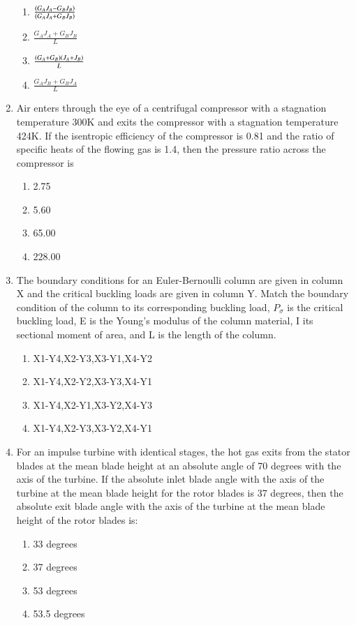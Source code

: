 \documentclass[journal]{IEEEtran}
\numberwithin{equation}{enumi}
\numberwithin{figure}{enumi}
\begin{document}
\begin{enumerate}[start=35]
    \begin{enumerate}
        \item $\frac{\left(G_A J_A - G_B J_B\right)}{\left(G_A J_A + G_B J_B\right)}$
	      \item $\frac{G_A J_A + G_B J_B}{L}$
	    \item $\frac{\left(G_A+G_B\right)\left(J_A+J_B\right)}{L}$
	    \item $\frac{G_A J_B + G_B J_A}{L}$
    \end{enumerate}
  \newpage  
  
   \item Air enters through the eye of a centrifugal compressor with a stagnation temperature 300K and exits the compressor with a stagnation temperature 424K. If the isentropic efficiency of the compressor is 0.81 and the ratio of specific heats of the flowing gas  is 1.4, then the pressure ratio across the compressor is
    \begin{enumerate}
    	\item 2.75
    	\item 5.60
    	\item 65.00
	\item 228.00
    \end{enumerate}

    \item  The boundary conditions for an Euler-Bernoulli column are given in column X and the critical buckling loads are given in column Y. Match the boundary condition of the column to its corresponding buckling load, $P_\sigma$ is the critical buckling load, E is the Young's modulus of the column material, I its sectional moment of area, and L is the length of the column.\\
    \begin{table}[h!]
    \centering
    
    \caption{}
    \end{table}
    \begin{enumerate}
    \item X1-Y4,X2-Y3,X3-Y1,X4-Y2
    \item X1-Y4,X2-Y2,X3-Y3,X4-Y1
    \item X1-Y4,X2-Y1,X3-Y2,X4-Y3
    \item X1-Y4,X2-Y3,X3-Y2,X4-Y1
    \end{enumerate}

    \item For an impulse turbine with identical stages, the hot gas exits from the stator blades at the mean blade height at an absolute angle of 70 degrees with the axis of the turbine. If the absolute inlet blade angle with the axis of the turbine at the mean blade height for the rotor blades is 37 degrees, then the absolute exit blade angle with the axis of the turbine at the mean blade height of the rotor blades is:
    \begin{enumerate}
        \item 33 degrees
        \item 37 degrees
        \item 53 degrees
        \item 53.5 degrees
    \end{enumerate}


\end{enumerate}
\end{document}
